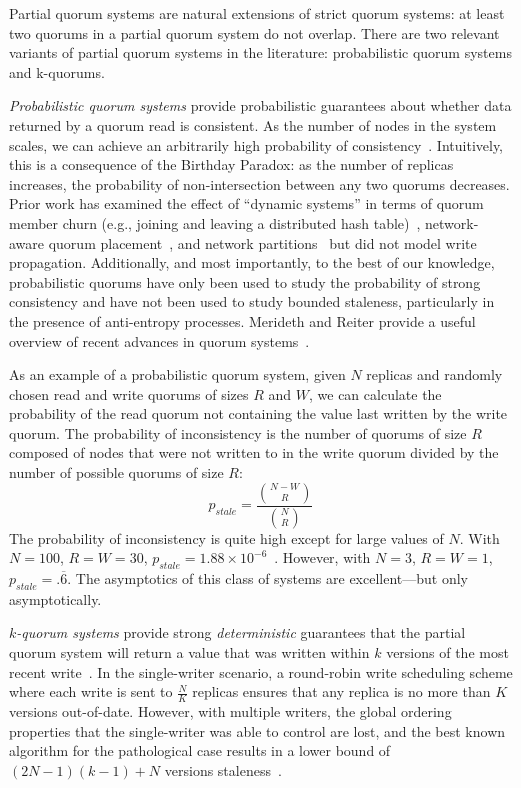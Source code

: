 \documentclass{vldb}
\begin{document}
Partial quorum systems are natural extensions of strict quorum
systems: at least two quorums in a partial quorum system do not
overlap.  There are two relevant variants of partial quorum systems in
the literature: probabilistic quorum systems and k-quorums.

\textit{Probabilistic quorum systems} provide probabilistic guarantees
about whether data returned by a quorum read is consistent.  As the
number of nodes in the system scales, we can achieve an arbitrarily
high probability of consistency~\cite{prob-quorum}.  Intuitively, this
is a consequence of the Birthday Paradox: as the number of replicas
increases, the probability of non-intersection between any two quorums
decreases.  Prior work has examined the effect of ``dynamic systems''
in terms of quorum member churn (e.g., joining and leaving a
distributed hash table)~\cite{prob-quorum-dynamic}, network-aware
quorum placement~\cite{delay-quorum, quorum-placement}, and network
partitions~\cite{partitionedquorum} but did not model write
propagation. Additionally, and most importantly, to the best of our
knowledge, probabilistic quorums have only been used to study the
probability of strong consistency and have not been used to study
bounded staleness, particularly in the presence of anti-entropy
processes.  Merideth and Reiter provide a useful overview of recent
advances in quorum systems~\cite{quorum-overview}.

As an example of a probabilistic quorum system, given $N$ replicas and
randomly chosen read and write quorums of sizes $R$ and $W$, we can
calculate the probability of the read quorum not containing the value
last written by the write quorum.  The probability of inconsistency is
the number of quorums of size $R$ composed of nodes that were not
written to in the write quorum divided by the number of possible
quorums of size $R$:
\begin{equation}
\label{eq:prob-strict}
p_{stale}=\frac{{N-W \choose R}}{{N \choose R}}
\end{equation}
The probability of inconsistency is quite high except for large values
of $N$.  With $N=100$, $R=W=30$, $p_{stale} = 1.88 \times
10^{-6}$~\cite{non-strict}.  However, with $N=3$, $R=W=1$, $p_{stale}
= .\overline{6}$.  The asymptotics of this class of systems are
excellent---but only asymptotically.

\textit{$k$-quorum systems} provide strong \textit{deterministic}
guarantees that the partial quorum system will return a value that was
written within $k$ versions of the most recent
write~\cite{non-strict}.  In the single-writer scenario, a round-robin
write scheduling scheme where each write is sent to $\frac{N}{K}$
replicas ensures that any replica is no more than $K$ versions
out-of-date.  However, with multiple writers, the global ordering
properties that the single-writer was able to control are lost, and
the best known algorithm for the pathological case results in a lower
bound of $(2N-1)(k-1)+N$ versions staleness~\cite{multi-k-quorum}.
\end{document}
